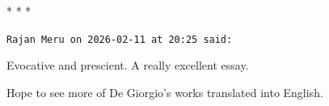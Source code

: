 
\begin{center}* * *\end{center}

\begin{footnotesize}
\begin{sffamily}
\texttt{Rajan Meru on 2026-02-11 at 20:25 said:}

Evocative and prescient. A really excellent essay.

Hope to see more of De Giorgio's works translated into English.

\end{sffamily}
\end{footnotesize}

